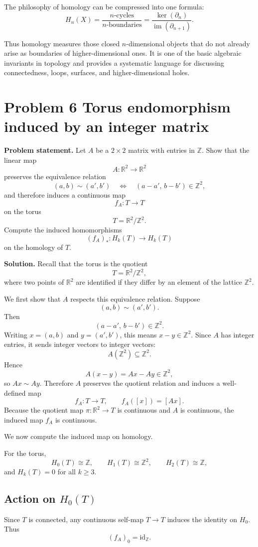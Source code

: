 \documentclass[12pt,a4paper]{article}
\theoremstyle{notespace}
\begin{document}
The philosophy of homology can be compressed into one formula:
\[
H_n(X)=\frac{\text{\(n\)-cycles}}{\text{\(n\)-boundaries}}
=
\frac{\ker(\partial_n)}{\operatorname{im}(\partial_{n+1})}.
\]

Thus homology measures those closed \(n\)-dimensional objects that do not already arise as boundaries of higher-dimensional ones. It is one of the basic algebraic invariants in topology and provides a systematic language for discussing connectedness, loops, surfaces, and higher-dimensional holes.

\section{Problem 6 Torus endomorphism induced by an integer matrix}

\textbf{Problem statement.}
Let \(A\) be a \(2\times 2\) matrix with entries in \(\mathbb Z\). Show that the linear map
\[
A:\mathbb R^2\to \mathbb R^2
\]
preserves the equivalence relation
\[
(a,b)\sim (a',b')
\quad\Longleftrightarrow\quad
(a-a',\,b-b')\in \mathbb Z^2,
\]
and therefore induces a continuous map
\[
f_A:T\to T
\]
on the torus
\[
T=\mathbb R^2/\mathbb Z^2.
\]
Compute the induced homomorphisms
\[
(f_A)_*:H_k(T)\to H_k(T)
\]
on the homology of \(T\).

\bigskip

\textbf{Solution.}
Recall that the torus is the quotient
\[
T=\mathbb R^2/\mathbb Z^2,
\]
where two points of \(\mathbb R^2\) are identified if they differ by an element of the lattice \(\mathbb Z^2\).

We first show that \(A\) respects this equivalence relation. Suppose
\[
(a,b)\sim (a',b').
\]
Then
\[
(a-a',\,b-b')\in \mathbb Z^2.
\]
Writing \(x=(a,b)\) and \(y=(a',b')\), this means \(x-y\in \mathbb Z^2\). Since \(A\) has integer entries, it sends integer vectors to integer vectors:
\[
A(\mathbb Z^2)\subseteq \mathbb Z^2.
\]
Hence
\[
A(x-y)=Ax-Ay\in \mathbb Z^2,
\]
so \(Ax\sim Ay\). Therefore \(A\) preserves the quotient relation and induces a well-defined map
\[
f_A:T\to T,
\qquad
f_A([x])=[Ax].
\]
Because the quotient map \(\pi:\mathbb R^2\to T\) is continuous and \(A\) is continuous, the induced map \(f_A\) is continuous.

We now compute the induced map on homology.

For the torus,
\[
H_0(T)\cong \mathbb Z,\qquad
H_1(T)\cong \mathbb Z^2,\qquad
H_2(T)\cong \mathbb Z,
\]
and \(H_k(T)=0\) for all \(k\ge 3\).

\subsection*{Action on \(H_0(T)\)}
Since \(T\) is connected, any continuous self-map \(T\to T\) induces the identity on \(H_0\). Thus
\[
(f_A)_0=\mathrm{id}_{\mathbb Z}.
\]
\end{document}
